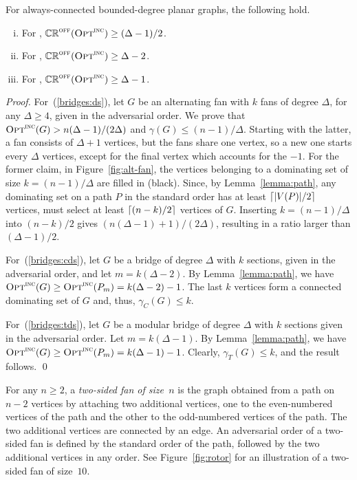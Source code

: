 \begin{proposition}
\label{prop:bridges}
For always-connected bounded-degree planar graphs, the following hold.
\begin{enumerate}[(i)]
\item \label{bridges:ds} For \ds, $\mathbb{CR}^{\textsc{off}}(\operatorname{\textsc{Opt}}^\textsc{\ensuremath{\text{inc}}}) \ge (\Delta-1)/2$.
\item \label{bridges:cds} For \cds, $\mathbb{CR}^{\textsc{off}}(\operatorname{\textsc{Opt}}^\textsc{\ensuremath{\text{inc}}}) \ge \Delta-2$.
\item \label{bridges:tds} For \tds, $\mathbb{CR}^{\textsc{off}}(\operatorname{\textsc{Opt}}^\textsc{\ensuremath{\text{inc}}}) \ge \Delta-1$.
\end{enumerate}
\end{proposition}
\begin{proof}
For~(\ref{bridges:ds}), let $G$ be an alternating fan with $k$ fans of degree $\Delta$, for any 
$\Delta \ge 4$, given in the adversarial order.
We prove that 
$\operatorname{\textsc{Opt}}^\textsc{\ensuremath{\text{inc}}}(G) > n(\Delta-1)/(2\Delta)$ and $\gamma(G) \leq (n - 1)/\Delta$.
Starting with the latter, a fan consists of $\Delta+1$ vertices,
but the fans share one vertex, so a new one starts every $\Delta$
vertices, except for the final vertex which accounts for the $-1$.
For the former claim,
in Figure~\ref{fig:alt-fan}, the vertices belonging to a dominating
set of size $k = (n-1)/\Delta$ are filled in (black).
Since, by Lemma~\ref{lemma:path}, any \incr dominating set
on a path $P$ in the standard order has at least $\lceil |V(P)|/2\rceil$ vertices,
\onopt must select at least $\lceil (n-k)/2\rceil$ vertices of $G$.
Inserting $k=(n-1)/\Delta$ into $(n-k)/2$ gives
$(n(\Delta-1)+1)/(2\Delta)$, resulting in a ratio larger than $(\Delta-1)/2$.

For~(\ref{bridges:cds}),
let $G$ be a bridge of degree $\Delta$ with $k$ sections, given in the 
adversarial order, and let $m=k(\Delta -2)$.
By Lemma~\ref{lemma:path}, we have $\operatorname{\textsc{Opt}}^\textsc{\ensuremath{\text{inc}}}(G) \ge \operatorname{\textsc{Opt}}^\textsc{\ensuremath{\text{inc}}}(P_m) = k(\Delta-2)-1$.
The last $k$ vertices form a connected dominating set of $G$ and, thus,
$\gamma_C(G) \le k$.

For~(\ref{bridges:tds}), 
let $G$ be a modular bridge of degree $\Delta$ with $k$ sections
given in the adversarial order.
Let $m=k(\Delta -1)$.
By Lemma~\ref{lemma:path}, we have $\operatorname{\textsc{Opt}}^\textsc{\ensuremath{\text{inc}}}(G) \ge \operatorname{\textsc{Opt}}^\textsc{\ensuremath{\text{inc}}}(P_m) =  k(\Delta-1)-1$.
Clearly, $\gamma_T(G) \le k$, and the result follows.
\qed\end{proof}


For any $n\ge 2$, a \emph{two-sided fan of size~$n$}
is the graph obtained from a
path on $n-2$ vertices by attaching two additional vertices, one to the
even-numbered vertices of the path and the other to the odd-numbered
vertices of the path. The two additional vertices are connected by
an edge. An adversarial order of a two-sided fan is defined by 
the standard order of the path, followed by the two additional
vertices in any order.
See Figure~\ref{fig:rotor} for an illustration of a two-sided fan of
size~$10$.

